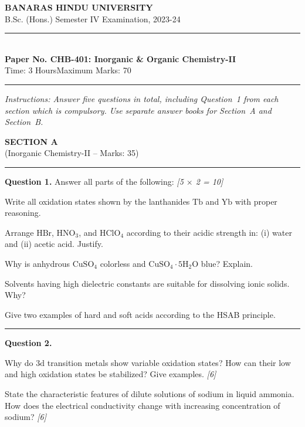 \documentclass[11pt,a4paper]{article}
\newcommand{\pts}[1]{\hfill   \textit{[#1]}}
\begin{document}
\begin{center}
  {\large\bfseries BANARAS HINDU UNIVERSITY}\\[2pt]
  {\normalsize B.Sc. (Hons.) Semester IV Examination, 2023-24}\\[6pt]
  \rule{0.8\linewidth}{0.5pt}\\[6pt]
  {\large\bfseries Paper No. CHB-401: Inorganic \& Organic Chemistry-II}\\[4pt]
  {\normalsize Time: 3 Hours\hfill Maximum Marks: 70}
\end{center}
\rule{\linewidth}{0.4pt}
\small



\noindent   \textit{Instructions: Answer five questions in total, including Question~1 from each section which is compulsory. Use separate answer books for Section~A and Section~B.}

\normalsize
\bigskip


\begin{center}
  {\large\bfseries SECTION A}\\[2pt]
  {\normalsize (Inorganic Chemistry-II -- Marks: 35)}
\end{center}
\rule{0.4\linewidth}{0.2pt}
\smallskip




\noindent   \textbf{Question 1.} Answer all parts of the following: \pts{5 $ \times$ 2 = 10}

\begin{parts}
  \item Write all oxidation states shown by the lanthanides $ \text{Tb}$ and $ \text{Yb}$ with proper reasoning.
  \item Arrange $ \text{HBr}$, $ \text{HNO}_3$, and $ \text{HClO}_4$ according to their acidic strength in: (i) water and (ii) acetic acid. Justify.
  \item Why is anhydrous $ \text{CuSO}_4$ colorless and $ \text{CuSO}_4\cdot5 \text{H}_2 \text{O}$ blue? Explain.
  \item Solvents having high dielectric constants are suitable for dissolving ionic solids. Why?
  \item Give two examples of hard and soft acids according to the HSAB principle.
\end{parts}

\medskip\rule{\linewidth}{0.2pt}




\noindent   \textbf{Question 2.}

\begin{parts}
  \item Why do $3 \text{d}$ transition metals show variable oxidation states? How can their low and high oxidation states be stabilized? Give examples. \pts{6}
  \item State the characteristic features of dilute solutions of sodium in liquid ammonia. How does the electrical conductivity change with increasing concentration of sodium? \pts{6}
\end{parts}
\end{document}
